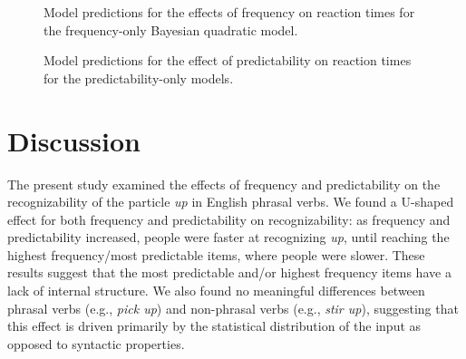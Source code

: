 \documentclass[
  authoryear,
  preprint,
  1p,
  onecolumn]{elsarticle}
\begin{document}
\begin{figure}


\caption{\label{fig-FreqOnlyPlot}Model predictions for the effects of
frequency on reaction times for the frequency-only Bayesian quadratic
model.}

\end{figure}%

\begin{figure}


\caption{\label{fig-PredicOnlyPlot}Model predictions for the effect of
predictability on reaction times for the predictability-only models.}

\end{figure}%

\section{Discussion}\label{discussion}

The present study examined the effects of frequency and predictability
on the recognizability of the particle \emph{up} in English phrasal
verbs. We found a U-shaped effect for both frequency and predictability
on recognizability: as frequency and predictability increased, people
were faster at recognizing \emph{up}, until reaching the highest
frequency/most predictable items, where people were slower. These
results suggest that the most predictable and/or highest frequency items
have a lack of internal structure. We also found no meaningful
differences between phrasal verbs (e.g., \emph{pick up}) and non-phrasal
verbs (e.g., \emph{stir up}), suggesting that this effect is driven
primarily by the statistical distribution of the input as opposed to
syntactic properties.
\end{document}
